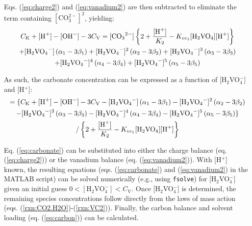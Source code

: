 \documentclass[onecolumn,aps,prl,floatfix,superscriptaddress,longbibliography,showkeys,fleqn]{revtex4-2}
\begin{document}
Eqs. (\ref{eq:charge2}) and (\ref{eq:vanadium2}) are then subtracted to eliminate the term containing $\mathrm{[CO_3^{2-}]^2}$, yielding:
\begin{multline}
	C_{\mathrm{K}} + [\ce{H+}] - [\ce{OH-}] - 3C_{\mathrm{V}} = [\ce{CO3^2-}]\left\{ 2 + \frac{[\ce{H+}]}{K_2} - K_{vc_1}[\ce{H2VO4}][\ce{H+}] \right\} \\
	+ [\ce{H2VO4-}]\left(\alpha_1-3\beta_1\right) + [\ce{H2VO4-}]^2\left(\alpha_2-3\beta_2\right) +[\ce{H2VO4-}]^3\left(\alpha_3-3\beta_3\right) \\
	+[\ce{H2VO4-}]^4\left(\alpha_4-3\beta_4\right) + [\ce{H2VO4-}]^5\left(\alpha_5-3\beta_5\right)
\end{multline}


As such, the carbonate concentration can be expressed as a function of [H$_2$VO$_4^-$] and [H$^+$]:
\begin{multline}
	[\ce{CO3^2-}] = \{C_{\mathrm{K}} + [\ce{H+}] - [\ce{OH-}] - 3C_{\mathrm{V}} - [\ce{H2VO4-}]\left(\alpha_1-3\beta_1\right) - [\ce{H2VO4-}]^2\left(\alpha_2-3\beta_2\right)		\\
	- [\ce{H2VO4-}]^3\left(\alpha_3-3\beta_3\right) - [\ce{H2VO4-}]^4\left(\alpha_4-3\beta_4\right) - [\ce{H2VO4-}]^5\left(\alpha_5-3\beta_5\right)\} 	\\
	/ \left\{2 + \frac{[\ce{H+}]}{K_2} - K_{vc_1}[\ce{H2VO4}][\ce{H+}]\right\}			\label{eq:carbonate}
\end{multline}


Eq. (\ref{eq:carbonate}) can be substituted into either the charge balance (eq. (\ref{eq:charge2})) or the vanadium balance (eq. (\ref{eq:vanadium2})). With [H$^+$] known, the resulting equations (eqs. (\ref{eq:carbonate}) and (\ref{eq:vanadium2}) in the MATLAB script) can be solved numerically (e.g., using \texttt{fsolve}) for [H$_2$VO$_4^-$] given an initial guess $0<[\mathrm{H_2VO_4^-}]<C_{\mathrm{V}}$. Once [H$_2$VO$_4^-$] is determined, the remaining species concentrations follow directly from the laws of mass action (eqs. (\ref{rxn:CO2.H2O})-(\ref{rxn:VC2})). Finally, the carbon balance and solvent loading (eq. (\ref{eq:carbon})) can be calculated.







\end{document}
